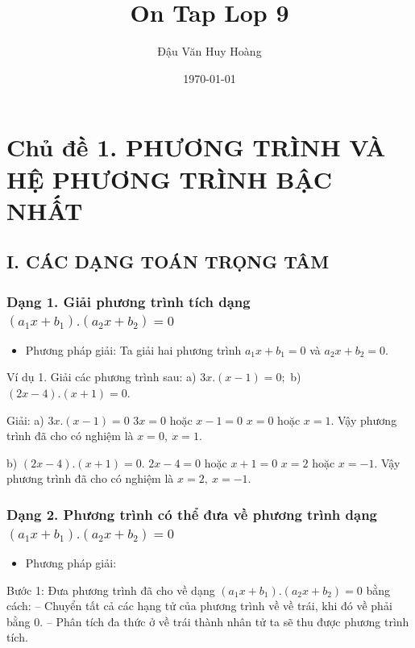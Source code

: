 \documentclass[%
    fontsize=12pt,%
    chapterprefix=false,%
    open=right,%
    twoside=false,%
    numbers=noenddot,%
    headings=optiontohead,%
    final,%
    DIV=15,%
    parskip=half %
]{scrbook}
\title{On Tap Lop 9}
\author{Đậu Văn Huy Hoàng}
\date{\today}
\begin{document}
\maketitle
\tableofcontents


\section{Chủ đề 1. PHƯƠNG TRÌNH VÀ HỆ PHƯƠNG TRÌNH BẬC NHẤT}

\subsection{I. CÁC DẠNG TOÁN TRỌNG TÂM}

\subsubsection{Dạng 1. Giải phương trình tích dạng $(a_1x + b_1).(a_2x + b_2) = 0$}

\begin{itemize}
  \item Phương pháp giải: Ta giải hai phương trình $a_1x + b_1 = 0$ và $a_2x + b_2 = 0$.
\end{itemize}

Ví dụ 1. Giải các phương trình sau:     a) $3x.(x - 1) = 0;$     b) $(2x - 4).(x + 1) = 0.$

Giải: a) $3x.(x - 1) = 0$         $3x = 0$ hoặc $x - 1 = 0$         $x = 0$ hoặc $x = 1$.     Vậy phương trình đã cho có nghiệm là $x = 0,\ x = 1$.

b) $(2x - 4).(x + 1) = 0.$         $2x - 4 = 0$ hoặc $x + 1 = 0$         $x = 2$ hoặc $x = -1$.     Vậy phương trình đã cho có nghiệm là $x = 2,\ x = -1$.
\subsubsection{Dạng 2. Phương trình có thể đưa về phương trình dạng $(a_1x + b_1).(a_2x + b_2) = 0$}

\begin{itemize}
  \item Phương pháp giải:
\end{itemize}

Bước 1: Đưa phương trình đã cho về dạng $(a_1x + b_1).(a_2x + b_2) = 0$ bằng cách:     -- Chuyển tất cả các hạng tử của phương trình về về trái, khi đó về phải bằng 0.     -- Phân tích đa thức ở về trái thành nhân tử ta sẽ thu được phương trình tích.
\end{document}
